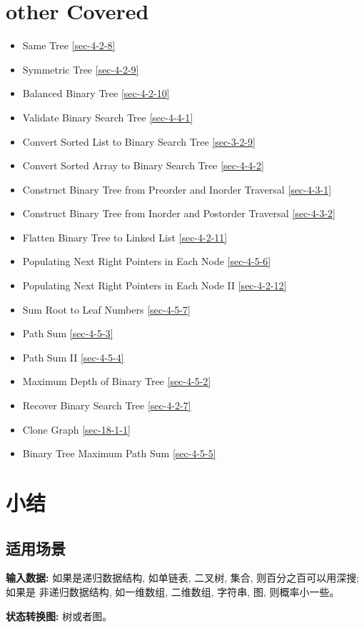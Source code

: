\documentclass[12pt]{book}
\begin{document}
\section{other Covered}
\label{sec-11-3}
\begin{itemize}
\item Same Tree
\ref{sec-4-2-8}
\item Symmetric Tree
\ref{sec-4-2-9}
\item Balanced Binary Tree
\ref{sec-4-2-10}
\item Validate Binary Search Tree
\ref{sec-4-4-1}
\item Convert Sorted List to Binary Search Tree
\ref{sec-3-2-9}
\item Convert Sorted Array to Binary Search Tree
\ref{sec-4-4-2}
\item Construct Binary Tree from Preorder and Inorder Traversal
\ref{sec-4-3-1}
\item Construct Binary Tree from Inorder and Postorder Traversal
\ref{sec-4-3-2}
\item Flatten Binary Tree to Linked List
\ref{sec-4-2-11}
\item Populating Next Right Pointers in Each Node
\ref{sec-4-5-6}
\item Populating Next Right Pointers in Each Node II
\ref{sec-4-2-12}
\item Sum Root to Leaf Numbers        
\ref{sec-4-5-7}
\item Path Sum
\ref{sec-4-5-3}
\item Path Sum II
\ref{sec-4-5-4}
\item Maximum Depth of Binary Tree
\ref{sec-4-5-2}
\item Recover Binary Search Tree
\ref{sec-4-2-7}
\item Clone Graph
\ref{sec-18-1-1}
\item Binary Tree Maximum Path Sum
\ref{sec-4-5-5}
\end{itemize}
\section{小结}
\label{sec-11-4}
\subsection{适用场景}
\label{sec-11-4-1}
\textbf{输入数据:} 如果是递归数据结构, 如单链表, 二叉树, 集合, 则百分之百可以用深搜;如果是
非递归数据结构, 如一维数组, 二维数组, 字符串, 图, 则概率小一些。

\textbf{状态转换图:} 树或者图。
\end{document}
